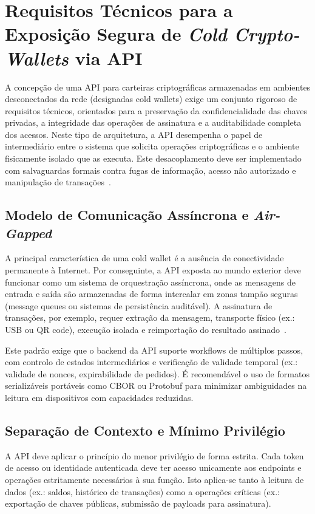 \newpage
\thispagestyle{otherpages}
\section{Requisitos Técnicos para a Exposição Segura de \textit{Cold Crypto-Wallets} via API}
A concepção de uma API para carteiras criptográficas armazenadas em ambientes desconectados da rede (designadas cold wallets) exige um conjunto rigoroso de requisitos técnicos, orientados para a preservação da confidencialidade das chaves privadas, a integridade das operações de assinatura e a auditabilidade completa dos acessos. Neste tipo de arquitetura, a API desempenha o papel de intermediário entre o sistema que solicita operações criptográficas e o ambiente fisicamente isolado que as executa. Este desacoplamento deve ser implementado com salvaguardas formais contra fugas de informação, acesso não autorizado e manipulação de transações~\cite{bonneau2015, boneh2019, oue2019}.

\subsection{Modelo de Comunicação Assíncrona e \textit{Air-Gapped}}
A principal característica de uma cold wallet é a ausência de conectividade permanente à Internet. Por conseguinte, a API exposta ao mundo exterior deve funcionar como um sistema de orquestração assíncrona, onde as mensagens de entrada e saída são armazenadas de forma intercalar em zonas tampão seguras (message queues ou sistemas de persistência auditável). A assinatura de transações, por exemplo, requer extração da mensagem, transporte físico (ex.: USB ou QR code), execução isolada e reimportação do resultado assinado~\cite{gudgeon2020}.

Este padrão exige que o backend da API suporte workflows de múltiplos passos, com controlo de estados intermediários e verificação de validade temporal (ex.: validade de nonces, expirabilidade de pedidos). É recomendável o uso de formatos serializáveis portáveis como CBOR ou Protobuf para minimizar ambiguidades na leitura em dispositivos com capacidades reduzidas.

\subsection{Separação de Contexto e Mínimo Privilégio}
A API deve aplicar o princípio do menor privilégio de forma estrita. Cada token de acesso ou identidade autenticada deve ter acesso unicamente aos endpoints e operações estritamente necessários à sua função. Isto aplica-se tanto à leitura de dados (ex.: saldos, histórico de transações) como a operações críticas (ex.: exportação de chaves públicas, submissão de payloads para assinatura).

